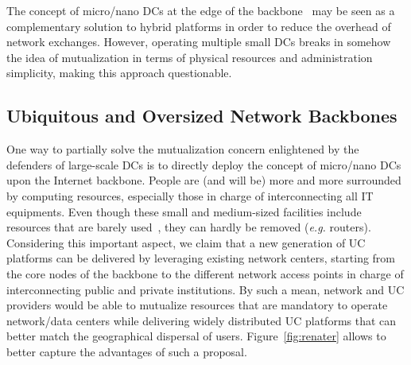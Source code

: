 The concept of micro/nano DCs at the edge of the backbone~\cite{greenberg:sigcomm09} may
be seen as a complementary solution to hybrid platforms in order to reduce the overhead of
network exchanges. However, operating multiple small DCs breaks in somehow the idea of
mutualization in terms of physical resources and administration simplicity, making this
approach questionable.

\subsection{Ubiquitous and Oversized Network Backbones}

One way to partially solve the mutualization concern enlightened by the defenders of
large-scale DCs is to directly deploy the concept of micro/nano DCs upon the Internet
backbone. People are (and will be) more and more surrounded by computing resources,
especially those in charge of interconnecting all IT equipments. Even though these small
and medium-sized facilities include resources that are barely
used~\cite{Andrew:2003,Benson:2010}, they can hardly be removed (\textit{e.g.} routers).
Considering this important aspect, we claim that a new generation of UC platforms can be
delivered by leveraging existing network centers, starting from the core nodes of the
backbone to the different network access points in charge of interconnecting public and
private institutions. By such a mean, network and UC providers would be able to mutualize
resources that are mandatory to operate network/data centers while delivering widely
distributed UC platforms that can better match the geographical dispersal of users.
%
%
Figure~\ref{fig:renater} allows to better capture the advantages of such a proposal.
